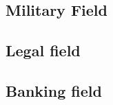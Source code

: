 \subsection{Military Field}
\label{sub-sec:military}
\newline

\subsection{Legal field}
\label{sub-sec:legal}
\newline

\subsection{Banking field}
\label{sub-sec:banking}
\newline
